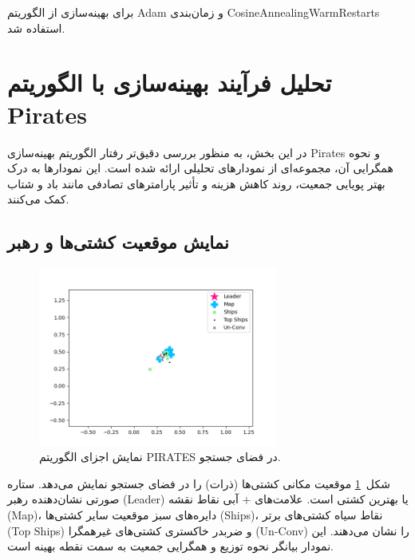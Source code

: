 برای بهینه‌سازی از الگوریتم Adam و زمان‌بندی CosineAnnealingWarmRestarts استفاده شد.
\section{تحلیل فرآیند بهینه‌سازی با الگوریتم Pirates}
در این بخش، به منظور بررسی دقیق‌تر رفتار الگوریتم بهینه‌سازی Pirates و نحوه همگرایی آن، مجموعه‌ای از نمودارهای تحلیلی ارائه شده است. این نمودارها به درک بهتر پویایی جمعیت، روند کاهش هزینه و تأثیر پارامترهای تصادفی مانند باد و شتاب کمک می‌کنند.

\subsection{نمایش موقعیت کشتی‌ها و رهبر}
\begin{figure}[h!]
    \centering
    \includegraphics[width=0.7\textwidth]{images/pirates_positions.png}
    \caption{نمایش اجزای الگوریتم PIRATES در فضای جستجو.}
    \label{fig:pirates_positions}
\end{figure}

شکل~\ref{fig:pirates_positions} موقعیت مکانی کشتی‌ها (ذرات) را در فضای جستجو نمایش می‌دهد. ستاره صورتی نشان‌دهنده رهبر (Leader) یا بهترین کشتی است. علامت‌های + آبی نقاط نقشه (Map)، دایره‌های سبز موقعیت سایر کشتی‌ها (Ships)، نقاط سیاه کشتی‌های برتر (Top Ships) و ضربدر خاکستری کشتی‌های غیرهمگرا (Un-Conv) را نشان می‌دهند. این نمودار بیانگر نحوه توزیع و همگرایی جمعیت به سمت نقطه بهینه است.

